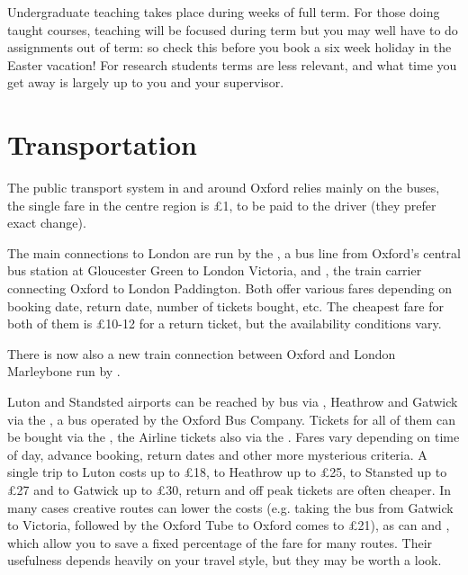Undergraduate teaching takes place during weeks of full term. For those doing taught courses, teaching will be focused during term but you may well have to do assignments out of term: so check this before you book a six week holiday in the Easter vacation! For research students terms are less relevant, and what time you get away is largely up to you and your supervisor.

\section{Transportation}

The public transport system in and around Oxford relies mainly on the
\href{http://www.oxfordbus.co.uk/}{} buses, the
single fare in the centre region is \pounds1, to be paid to the driver (they
prefer exact change).

The main connections to London are run by the
\href{http://www.oxfordtube.com/}{}, a bus line from
Oxford's central bus station at Gloucester Green to London Victoria, and
\href{https://www.firstgreatwestern.co.uk/}{},
the train carrier connecting Oxford to London Paddington. Both offer various fares depending on booking date,
return date, number of tickets bought, etc. The cheapest fare for both of them
is \pounds10-12 for a return ticket, but the availability conditions
vary.

There is now also a new train connection between Oxford and London Marleybone run by \href{https://www.chilternrailways.co.uk/}{}. 

Luton and Standsted airports can be reached by bus via
\href{http://www.nationalexpress.com/}{}, Heathrow
and Gatwick via the \href{http://airline.oxfordbus.co.uk/}{},
a bus operated by the Oxford Bus Company.
Tickets for all of them can be bought via the
\href{http://www.nationalexpress.com/}{}, the
Airline tickets also via the \href{https://airlinebooking.oxfordbus.co.uk/}{}.
Fares vary depending on time of day, advance booking, return dates and other
more mysterious criteria. A single trip to Luton costs up to \pounds18, to
Heathrow up to \pounds25, to Stansted up to \pounds27 and to Gatwick up to \pounds30,
return and off peak tickets are often cheaper.
In many cases creative routes can lower the costs (e.g. taking the bus from
Gatwick to Victoria, followed by the Oxford Tube to Oxford comes to \pounds21),
as can
\href{http://www.nationalexpress.com/waystosave/young-persons-coachcard.aspx}
{}
and \href{http://www.railcard.co.uk/}{}, which allow you to
save a fixed percentage of the fare for many routes. Their usefulness depends heavily on your travel style, but they may be worth a look.
